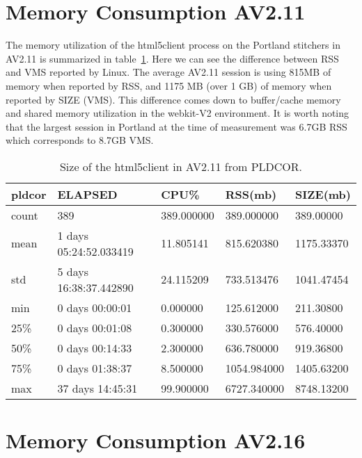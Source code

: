 \documentclass{article}
\begin{document}
\section{Memory Consumption AV2.11}
\label{SECTION-211Memory}


The memory utilization of the html5client process on the Portland stitchers in AV2.11 is summarized in table~\ref{TABLE-AV211SessionSize}. Here we can see the difference between RSS and VMS reported by Linux. The average AV2.11 session is using 815MB of memory when reported by RSS, and 1175 MB (over 1 GB) of memory when reported by SIZE (VMS). This difference comes down to buffer/cache memory and shared memory utilization in the webkit-V2 environment. It is worth noting that the largest session in Portland at the time of measurement was 6.7GB RSS which corresponds to 8.7GB VMS.



\begin{table}[H]
\begin{tabular}{|l|l|l|l|l|}
\hline pldcor& ELAPSED&   CPU\%&  RSS(mb)&   SIZE(mb) \\
\hline count&    389& 389.000000&  389.000000&  389.00000 \\
\hline mean&  1 days 05:24:52.033419&  11.805141&  815.620380& 1175.33370 \\
\hline std&  5 days 16:38:37.442890&  24.115209&  733.513476& 1041.47454 \\
\hline min&   0 days 00:00:01&  0.000000&  125.612000&  211.30800 \\
\hline 25\%&   0 days 00:01:08&  0.300000&  330.576000&  576.40000 \\
\hline 50\%&   0 days 00:14:33&  2.300000&  636.780000&  919.36800 \\
\hline 75\%&   0 days 01:38:37&  8.500000& 1054.984000& 1405.63200 \\
\hline max&  37 days 14:45:31&  99.900000& 6727.340000& 8748.13200 \\
\hline 
\end{tabular}
\caption{\label{TABLE-AV211SessionSize}Size of the html5client in AV2.11 from PLDCOR.} 
\end{table}



\newpage

\section{Memory Consumption AV2.16}
\label{SECTION-216Memory}
\end{document}
